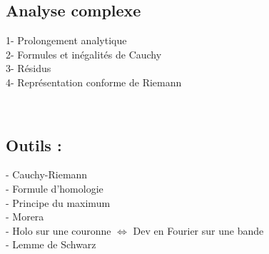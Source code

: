 \documentclass[11pt,a4paper]{article}
\begin{document}
\newpage
\begin{center}
\section*{Analyse complexe} 
\end{center}

1- Prolongement analytique \\

2- Formules et inégalités de Cauchy \\

3- Résidus \\

4- Représentation conforme de Riemann

~\\

\subsection*{Outils :}
- Cauchy-Riemann \\

- Formule d'homologie \\

- Principe du maximum \\

- Morera \\

- Holo sur une couronne $\Leftrightarrow$ Dev en Fourier sur une bande \\

- Lemme de Schwarz \\
\end{document}

